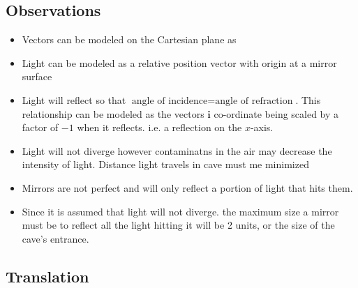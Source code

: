 \documentclass[11pt, letterpaper]{article}
\begin{document}
\subsection{Observations}
\par
\begin{itemize}
\item Vectors can be modeled on the Cartesian plane as 

\item Light can be modeled as a relative position vector with origin at a mirror surface

\item Light will reflect so that $\textrm{angle  of incidence} = \textrm{angle of refraction}$. This relationship can be modeled as the vectors $\bm{i}$ co-ordinate being scaled by a factor of $-1$ when it reflects. i.e. a reflection on the $x$-axis.

\item Light will not diverge however contaminatns in the air may decrease the intensity of light. Distance light travels in cave must me minimized

\item Mirrors are not perfect and will only reflect a portion of light that hits them. 

\item  Since it is assumed that light will not diverge. the maximum size a mirror must be to reflect all the light hitting it will be 2 units, or the size of the cave's entrance.


\end{itemize}





\subsection{Translation}
\par 
\end{document}
